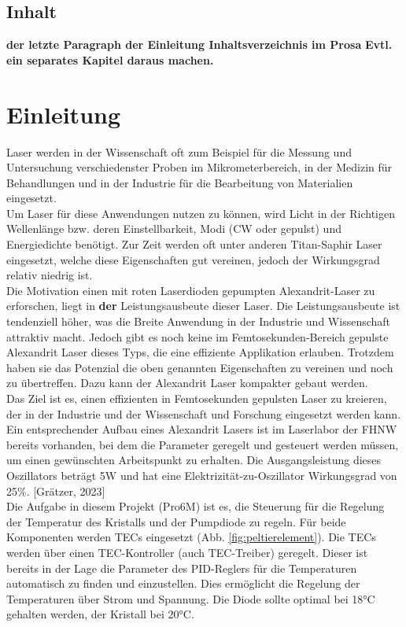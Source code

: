 \subsection*{Inhalt}
\textbf{der letzte Paragraph der Einleitung Inhaltsverzeichnis im Prosa} \textbf{Evtl. ein separates Kapitel daraus machen.}

\section{Einleitung}
Laser werden in der Wissenschaft oft zum Beispiel für die Messung und Untersuchung verschiedenster Proben im Mikrometerbereich, in der Medizin für Behandlungen und in der Industrie für die Bearbeitung von Materialien eingesetzt.\\
Um Laser für diese Anwendungen nutzen zu können, wird Licht in der Richtigen Wellenlänge bzw. deren Einstellbarkeit, Modi (CW oder gepulst) und Energiedichte benötigt. Zur Zeit werden oft unter anderen Titan-Saphir Laser eingesetzt, welche diese Eigenschaften gut vereinen, jedoch der Wirkungsgrad relativ niedrig ist.\\
Die Motivation einen mit roten Laserdioden gepumpten Alexandrit-Laser zu erforschen, liegt in \textbf{der} Leistungsausbeute dieser Laser. Die Leistungsausbeute ist tendenziell höher, was die Breite Anwendung in der Industrie und Wissenschaft attraktiv macht. Jedoch gibt es noch keine im Femtosekunden-Bereich gepulste Alexandrit Laser dieses Typs, die eine effiziente Applikation erlauben. Trotzdem haben sie das Potenzial die oben genannten Eigenschaften zu vereinen und noch zu übertreffen. Dazu kann der Alexandrit Laser kompakter gebaut werden.\\

Das Ziel ist es, einen effizienten in Femtosekunden gepulsten Laser zu kreieren, der in der Industrie und der Wissenschaft und Forschung eingesetzt werden kann.\\
Ein entsprechender Aufbau eines Alexandrit Lasers ist im Laserlabor der FHNW bereits vorhanden, bei dem die Parameter geregelt und gesteuert werden müssen, um einen gewünschten Arbeitspunkt zu erhalten. Die Ausgangsleistung dieses Oszillators beträgt 5W und hat eine Elektrizität-zu-Oszillator Wirkungsgrad von 25\%. [Grätzer, 2023]\\  %

Die Aufgabe in diesem Projekt (Pro6M) ist es,  die Steuerung für die Regelung der Temperatur des Kristalls und der Pumpdiode zu regeln. Für beide Komponenten werden TECs eingesetzt (Abb. \ref{fig:peltierelement}).  Die TECs werden über einen TEC-Kontroller (auch TEC-Treiber) geregelt. Dieser ist bereits in der Lage  die Parameter des PID-Reglers für die Temperaturen automatisch zu finden und einzustellen. Dies ermöglicht die Regelung der Temperaturen über Strom und Spannung. Die Diode sollte optimal bei 18°C gehalten werden, der Kristall bei 20°C.

